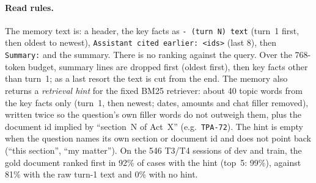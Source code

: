 \paragraph{Read rules.}
The memory text is: a header, the key facts as \texttt{- (turn N) text} (turn~1 first, then oldest to
newest), \texttt{Assistant cited earlier: <ids>} (last 8), then \texttt{Summary:} and the summary.
There is no ranking against the query. Over the 768-token budget, summary lines are dropped first
(oldest first), then key facts other than turn~1; as a last resort the text is cut from the end.
The memory also returns a \emph{retrieval hint} for the fixed BM25 retriever: about 40 topic words
from the key facts only (turn~1, then newest; dates, amounts and chat filler removed), written twice
so the question's own filler words do not outweigh them, plus the document id implied by
``section~N of Act~X'' (e.g.\ \texttt{TPA-72}). The hint is empty when the question names its own
section or document id and does not point back (``this section'', ``my matter''). On the 546 T3/T4
sessions of dev and train, the gold document ranked first in 92\% of cases with the hint (top~5:
99\%), against 81\% with the raw turn-1 text and 0\% with no hint.
